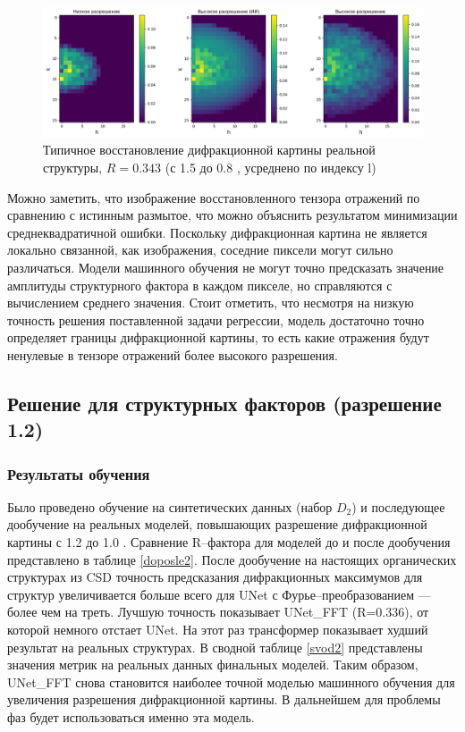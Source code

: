 \begin{figure}[H]
    \centering
    \includegraphics[width=1\textwidth]{figures/real.png}
    \caption{Типичное восстановление дифракционной картины реальной структуры, $R = 0.343$ (с 1.5 до 0.8 \angstrom, усреднено по индексу l)}
    \label{recon_ex}
\end{figure}

Можно заметить, что изображение восстановленного тензора отражений по сравнению с истинным размытое, что можно объяснить результатом минимизации среднеквадратичной ошибки. Поскольку дифракционная картина не является локально связанной, как изображения, соседние пиксели могут сильно различаться. Модели машинного обучения не могут точно предсказать значение амплитуды структурного фактора в каждом пикселе, но справляются с вычислением среднего значения. Стоит отметить, что несмотря на низкую точность решения поставленной задачи регрессии, модель достаточно точно определяет границы дифракционной картины, то есть какие отражения будут ненулевые в тензоре отражений более высокого разрешения.

\subsection{Решение для структурных факторов (разрешение 1.2\angstrom)}


\subsubsection{Результаты обучения}

Было проведено обучение на синтетических данных (набор $D_2$) и последующее дообучение на реальных моделей, повышающих разрешение дифракционной картины с 1.2 до 1.0 \angstrom. Сравнение R--фактора для моделей до и после дообучения представлено в таблице \ref{doposle2}. После дообучение на настоящих органических структурах из CSD точность предсказания дифракционных максимумов для структур увеличивается больше всего для UNet с Фурье--преобразованием --- более чем на треть. Лучшую точность показывает UNet\_FFT (R=0.336), от которой немного отстает UNet. На этот раз трансформер показывает худший результат на реальных структурах. В сводной таблице \ref{svod2} представлены значения метрик на реальных данных финальных моделей. Таким образом, UNet\_FFT снова становится наиболее точной моделью машинного обучения для увеличения разрешения дифракционной картины. В дальнейшем для проблемы фаз будет использоваться именно эта модель.

